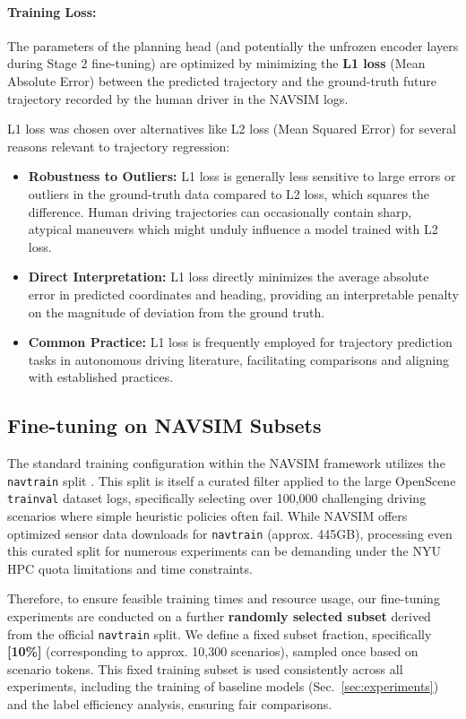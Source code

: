 \documentclass{article}
\begin{document}
\paragraph{Training Loss:}
The parameters of the planning head (and potentially the unfrozen encoder layers during Stage 2 fine-tuning) are optimized by minimizing the \textbf{L1 loss} (Mean Absolute Error) between the predicted trajectory and the ground-truth future trajectory recorded by the human driver in the NAVSIM logs.

L1 loss was chosen over alternatives like L2 loss (Mean Squared Error) for several reasons relevant to trajectory regression:
\begin{itemize}
    \item \textbf{Robustness to Outliers:} L1 loss is generally less sensitive to large errors or outliers in the ground-truth data compared to L2 loss, which squares the difference. Human driving trajectories can occasionally contain sharp, atypical maneuvers which might unduly influence a model trained with L2 loss.
    \item \textbf{Direct Interpretation:} L1 loss directly minimizes the average absolute error in predicted coordinates and heading, providing an interpretable penalty on the magnitude of deviation from the ground truth.
    \item \textbf{Common Practice:} L1 loss is frequently employed for trajectory prediction tasks in autonomous driving literature, facilitating comparisons and aligning with established practices.
\end{itemize}

\subsection{Fine-tuning on NAVSIM Subsets}
\label{subsec:subset}
The standard training configuration within the NAVSIM framework utilizes the \texttt{navtrain} split \cite{dauner2024navsim}. This split is itself a curated filter applied to the large OpenScene \texttt{trainval} dataset logs, specifically selecting over 100,000 challenging driving scenarios where simple heuristic policies often fail. While NAVSIM offers optimized sensor data downloads for \texttt{navtrain} (approx. 445GB), processing even this curated split for numerous experiments can be demanding under the NYU HPC quota limitations and time constraints.

Therefore, to ensure feasible training times and resource usage, our fine-tuning experiments are conducted on a further \textbf{randomly selected subset} derived from the official \texttt{navtrain} split. We define a fixed subset fraction, specifically \textbf{[10\%]} (corresponding to approx. 10,300 scenarios), sampled once based on scenario tokens. This fixed training subset is used consistently across all experiments, including the training of baseline models (Sec.~\ref{sec:experiments}) and the label efficiency analysis, ensuring fair comparisons.
\end{document}
